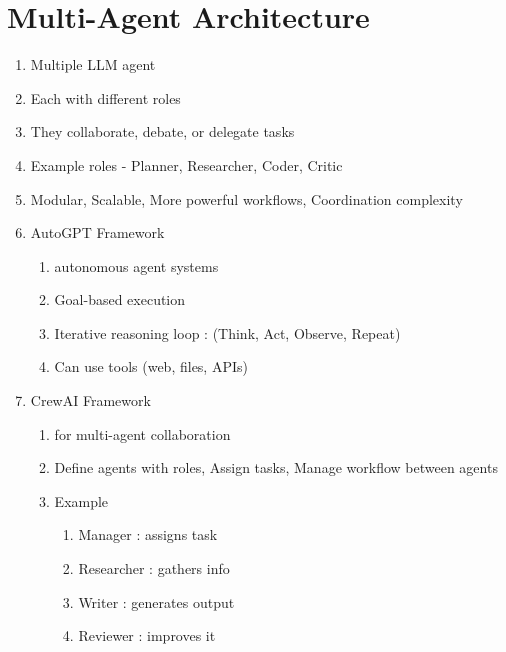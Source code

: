 \section{Multi-Agent Architecture}
    \begin{enumerate}
        \item Multiple LLM agent 
        \item Each with different roles
        \item They collaborate, debate, or delegate tasks
        \item Example roles - Planner, Researcher, Coder, Critic
        \item Modular, Scalable, More powerful workflows, Coordination complexity
        \item AutoGPT Framework
            \begin{enumerate}
                \item autonomous agent systems
                \item Goal-based execution
                \item Iterative reasoning loop : (Think, Act, Observe, Repeat)
                \item Can use tools (web, files, APIs)
            \end{enumerate}
            
        \clearpage
        \item CrewAI Framework
            \begin{enumerate}
                \item for multi-agent collaboration
                \item Define agents with roles, Assign tasks, Manage workflow between agents
                \item Example
                \begin{enumerate}
                    \item Manager : assigns task
                    \item Researcher : gathers info
                    \item Writer : generates output
                    \item Reviewer : improves it
                \end{enumerate}
            \end{enumerate}
    \end{enumerate}